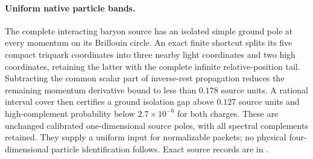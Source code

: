 \paragraph{Uniform native particle bands.}
The complete interacting baryon source has an isolated simple ground pole
at every momentum on its Brillouin circle. An exact finite shortcut splits
its five compact triquark coordinates into three nearby light coordinates
and two high coordinates, retaining the latter with the complete infinite
relative-position tail. Subtracting the common scalar part of inverse-rest
propagation reduces the remaining momentum derivative bound to less than
$0.178$ source units. A rational interval cover then certifies a ground
isolation gap above $0.127$ source units and high-complement probability
below $2.7\times10^{-6}$ for both charges. These are unchanged calibrated
one-dimensional source poles, with all spectral complements retained.
They supply a uniform input for normalizable packets; no physical
four-dimensional particle identification follows. Exact source records
are in .
